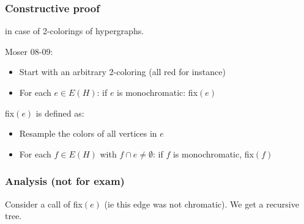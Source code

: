 \subsubsection{Constructive proof}
in case of 2-colorings of hypergraphs.

Moser 08-09:
\begin{itemize}
	\item Start with an arbitrary 2-coloring (all red for instance)
	\item For each $e \in E(H)$: if $e$ is monochromatic: fix$(e)$
\end{itemize}

fix$(e)$ is defined as:
\begin{itemize}
	\item Resample the colors of all vertices in $e$
	\item For each $f \in E(H)$ with $f \cap e \neq \emptyset$: if $f$ is monochromatic, fix$(f)$
\end{itemize}


\subsubsection{Analysis (not for exam)}
Consider a call of fix$(e)$ (ie this edge was not chromatic). We get a recursive tree.


